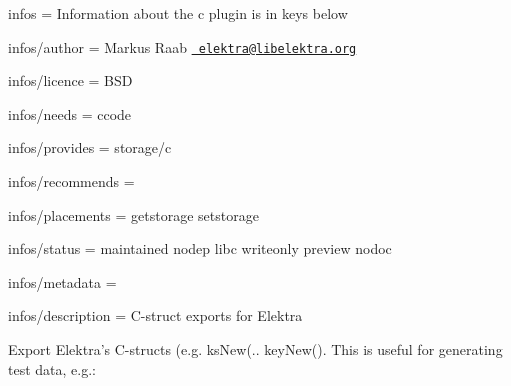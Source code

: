 
\begin{DoxyItemize}
\item infos = Information about the c plugin is in keys below
\item infos/author = Markus Raab \href{mailto:elektra@libelektra.org}{\texttt{ elektra@libelektra.\+org}}
\item infos/licence = B\+SD
\item infos/needs = ccode
\item infos/provides = storage/c
\item infos/recommends =
\item infos/placements = getstorage setstorage
\item infos/status = maintained nodep libc writeonly preview nodoc
\item infos/metadata =
\item infos/description = C-\/struct exports for Elektra
\end{DoxyItemize}

Export Elektra’s C-\/structs (e.\+g. {\ttfamily ks\+New(.. key\+New(}). This is useful for generating test data, e.\+g.\+:


\begin{DoxyCode}{0}
\end{DoxyCode}
 